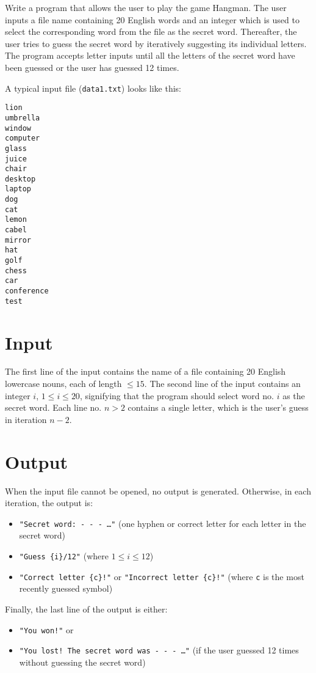 
Write a program that allows the user to play the game Hangman. 
The user inputs a file name containing 20 English words and an integer which is used to select the corresponding word from the file as the secret word.
Thereafter, the user tries to guess the secret word by iteratively suggesting its individual letters. 
The program accepts letter inputs until all the letters of the secret word have been guessed or the user has guessed 12 times.

A typical input file (\texttt{data1.txt}) looks like this: 

\begin{verbatim}
lion
umbrella
window
computer
glass
juice
chair
desktop
laptop
dog
cat
lemon
cabel
mirror
hat
golf
chess
car
conference
test   
\end{verbatim}


\section*{Input}
The first line of the input contains the name of a file containing 20 English lowercase nouns, each of length $\le 15$. 
The second line of the input contains an integer $i$, $1 \le i \le 20$, signifying that the program should select word no. $i$ as the secret word.
Each line no. $n > 2$ contains a single letter, which is the user's guess in iteration $n-2$.

\section*{Output}
When the input file cannot be opened, no output is generated. 
Otherwise, in each iteration, the output is:
\begin{itemize}
    \item \texttt{"Secret word: - - - \ldots"} (one hyphen or correct letter for each letter in the secret word)
    \item \texttt{"Guess \{i\}/12"} (where $1 \le i \le 12$)
    \item \texttt{"Correct letter \{c\}!"} or \texttt{"Incorrect letter \{c\}!"} (where \texttt{c} is the most recently guessed symbol)
\end{itemize}

Finally, the last line of the output is either:
\begin{itemize}
    \item \texttt{"You won!"} or
    \item \texttt{"You lost! The secret word was - - - \ldots"} (if the user guessed 12 times without guessing the secret word)
\end{itemize}
